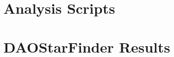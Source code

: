 \documentclass[%
aip,
jmp,
reprint,
floatfix,
nobibfootnote,
]{revtex4-1}
\begin{document}
	\section{Analysis Scripts}
	
	

	\section{DAOStarFinder Results}
	\begin{table}[H]
		\centering
		\caption{Table of the results from DAOStarFinder for each of the 10 photometric V \SI{0.1}{\second} exposures}
		
		\label{table:dao}
	\end{table}


	
\end{document}

